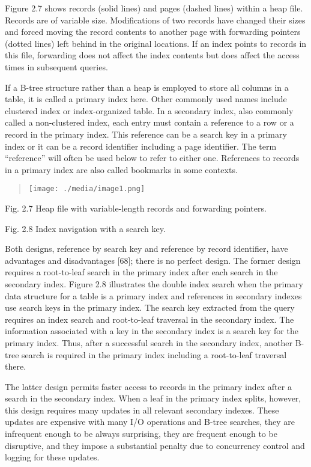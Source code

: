 Figure 2.7 shows records (solid lines) and pages (dashed lines) within a
heap file. Records are of variable size. Modifications of two records
have changed their sizes and forced moving the record contents to
another page with forwarding pointers (dotted lines) left behind in the
original locations. If an index points to records in this file,
forwarding does not affect the index contents but does affect the access
times in subsequent queries.

If a B-tree structure rather than a heap is employed to store all
columns in a table, it is called a primary index here. Other commonly
used names include clustered index or index-organized table. In a
secondary index, also commonly called a non-clustered index, each entry
must contain a reference to a row or a record in the primary index. This
reference can be a search key in a primary index or it can be a record
identifier including a page identifier. The term ``reference'' will
often be used below to refer to either one. References to records in a
primary index are also called bookmarks in some contexts.

\begin{quote}
\texttt{[image: ./media/image1.png]}
\end{quote}

Fig. 2.7 Heap file with variable-length records and forwarding pointers.

Fig. 2.8 Index navigation with a search key.

Both designs, reference by search key and reference by record
identifier, have advantages and disadvantages {[}68{]}; there is no
perfect design. The former design requires a root-to-leaf search in the
primary index after each search in the secondary index. Figure 2.8
illustrates the double index search when the primary data structure for
a table is a primary index and references in secondary indexes use
search keys in the primary index. The search key extracted from the
query requires an index search and root-to-leaf traversal in the
secondary index. The information associated with a key in the secondary
index is a search key for the primary index. Thus, after a successful
search in the secondary index, another B-tree search is required in the
primary index including a root-to-leaf traversal there.

The latter design permits faster access to records in the primary index
after a search in the secondary index. When a leaf in the primary index
splits, however, this design requires many updates in all relevant
secondary indexes. These updates are expensive with many I/O operations
and B-tree searches, they are infrequent enough to be always surprising,
they are frequent enough to be disruptive, and they impose a substantial
penalty due to concurrency control and logging for these updates.


